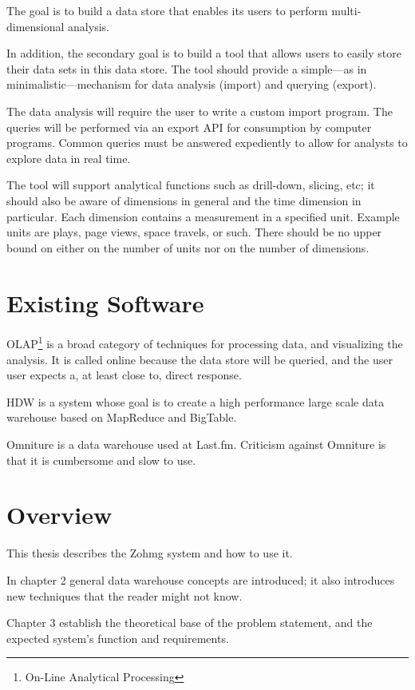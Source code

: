 The goal is to build a data store that enables its users to perform
multi-dimensional analysis.

In addition, the secondary goal is to build a tool that allows users to easily
store their data sets in this data store. The tool should provide a simple---as
in minimalistic---mechanism for data analysis (import) and querying (export).

The data analysis will require the user to write a custom import program. The
queries will be performed via an export API for consumption by computer
programs. Common queries must be answered expediently to allow for analysts to
explore data in real time.

The tool will support analytical functions such as drill-down, slicing, etc; it
should also be aware of dimensions in general and the time dimension in
particular. Each dimension contains a measurement in a specified unit.  Example
units are plays, page views, space travels, or such. There should be no upper
bound on either on the number of units nor on the number of dimensions.




\section*{Existing Software}


OLAP\footnote{On-Line Analytical Processing} is a broad category of techniques
for processing data, and visualizing the analysis. It is called online because
the data store will be queried, and the user user expects a, at least close to,
direct response.

HDW is a system whose goal is to create a high performance large scale data
warehouse based on MapReduce and BigTable. \cite{hdw}

Omniture is a data warehouse used at Last.fm. Criticism against Omniture is
that it is cumbersome and slow to use. \cite{omniture}


\section*{Overview}

This thesis describes the Zohmg system and how to use it.

In chapter 2 general data warehouse concepts are introduced; it also introduces
new techniques that the reader might not know.

Chapter 3 establish the theoretical base of the problem statement, and the
expected system's function and requirements.

